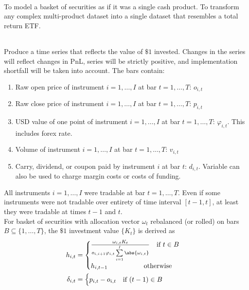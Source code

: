 \begin{definition} \\
To model a basket of securities as if it was a single cash product. To transform any complex multi-product dataset into a single dataset that resembles a total return ETF.
\end{definition}

\begin{method} \\
Produce a time series that reflects the value of $\$1$ invested. Changes in the series will reflect changes in PnL, series will be strictly positive, and implementation shortfall will be taken into account. The bars contain:
\begin{enumerate}[label=\roman*.]
\setlength{\itemsep}{0pt}
\item Raw open price of instrument $i = 1, \ldots, I$ at bar $t = 1, \ldots, T$: $o_{i,t}$
\item Raw close price of instrument $i = 1, \ldots, I$ at bar $t = 1, \ldots, T$: $p_{i,t}$
\item USD value of one point of instrument $i = 1, \ldots, I$ at bar $t = 1, \ldots, T$: $\varphi_{i,t}$. This includes forex rate.
\item Volume of instrument $i = 1, \ldots, I$ at bar $t = 1, \ldots, T$: $v_{i,t}$
\item Carry, dividend, or coupon paid by instrument $i$ at bar $t$: $d_{i,t}$. Variable can also be used to charge margin costs or costs of funding.
\end{enumerate}
All instruments $i = 1, \ldots, I$ were tradable at bar $t = 1, \ldots, T$. Even if some instruments were not tradable over entirety of time interval $[t-1, t]$, at least they were tradable at times $t-1$ and $t$.\\
For basket of securities with allocation vector $\omega_t$ rebalanced (or rolled) on bars $B \subseteq \{1, \ldots, T \}$, the $\$1$ investment value $\{K_t\}$ is derived as 
\begin{align}
h_{i,t} &= 
\begin{cases}
\frac{\omega_{i,t} K_t}{o_{i, i+1} \varphi_{i,t} \sum\limits_{i=1}^I \abs{\omega_{i,t}}} \ \ \ \text{if } t \in B \\
h_{i, t - 1} \ \ \ \ \ \ \ \ \ \ \ \ \ \ \ \ \text{otherwise}
\end{cases} \nonumber \\
\delta_{i,t} &=
\begin{cases}
p_{i,t} - o_{i,t} \ \ \ \text{if } (t-1) \in B \\

\end{cases}
\end{align}
\end{method}
